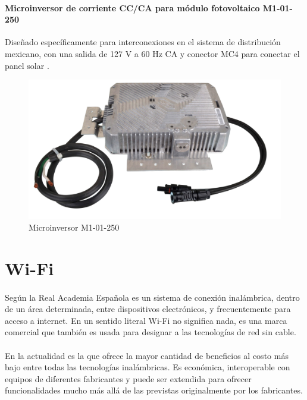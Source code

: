 \paragraph{Microinversor de corriente CC/CA para módulo fotovoltaico M1-01-250}
Diseñado específicamente para interconexiones en el sistema de distribución mexicano, con una salida de 127 V a 60 Hz CA y conector MC4 para conectar el panel solar \citep{MarcoTeorico3}.

\begin{figure}[H]
	\centering
	\includegraphics[scale=.20]{Capitulo2/images/microinversor.png}
	\caption{Microinversor M1-01-250}
	\label{fig:diagrama_dispensador}
\end{figure}
 
 
 \section{Wi-Fi}
 \paragraph{}
 Según la Real Academia Española es un sistema de conexión inalámbrica, dentro de un área determinada, entre dispositivos electrónicos, y frecuentemente para acceso a internet. En un sentido literal Wi-Fi no significa nada, es una marca comercial que también es usada para designar a las tecnologías de red sin cable.
 \paragraph{}
 En la actualidad es la que ofrece la mayor cantidad de beneficios al costo más bajo entre todas las tecnologías inalámbricas. Es económica, interoperable con equipos de diferentes fabricantes y puede ser extendida para ofrecer funcionalidades mucho más allá de las previstas originalmente por los fabricantes.
 
